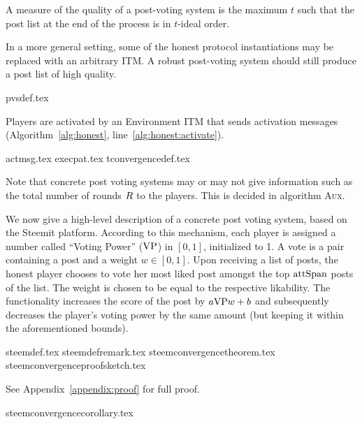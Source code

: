     A measure of the quality of a post-voting system is the maximum $t$ such
    that the post list at the end of the process is in $t$-ideal order.

    In a more general setting, some of the honest protocol instantiations may be
    replaced with an arbitrary ITM. A robust post-voting system should still
    produce a post list of high quality.

    {pvsdef.tex}

    \noindent Players are activated by an Environment ITM that sends activation
    messages (Algorithm~\ref{alg:honest}, line~\ref{alg:honest:activate}).

    {actmsg.tex}
    {execpat.tex}
    {tconvergencedef.tex}

    \noindent Note that concrete post voting systems may or may not give
    information such as the total number of rounds $R$ to the players.
    This is decided in algorithm \textsc{Aux}.

    We now give a high-level description of a concrete post voting system, based
    on the Steemit platform. According to this mechanism, each player is
    assigned a number called ``Voting Power'' ($\mathrm{VP}$) in $\left[0,
    1\right]$, initialized to 1. A vote is a pair containing a post and a weight
    $w \in \left[0, 1\right]$. Upon receiving a list of posts, the honest player
    chooses to vote her most liked post amongst the top $\mathrm{attSpan}$ posts of the
    list. The weight is chosen to be equal to the respective likability. The
    functionality increases the score of the post by $a \mathrm{VP} w + b$ and
    subsequently decreases the player's voting power by the same amount (but
    keeping it within the aforementioned bounds).

    {steemdef.tex}
    {steemdefremark.tex}
    {steemconvergencetheorem.tex}
    {steemconvergenceproofsketch.tex}

    See Appendix~\ref{appendix:proof} for full proof.

    {steemconvergencecorollary.tex}
